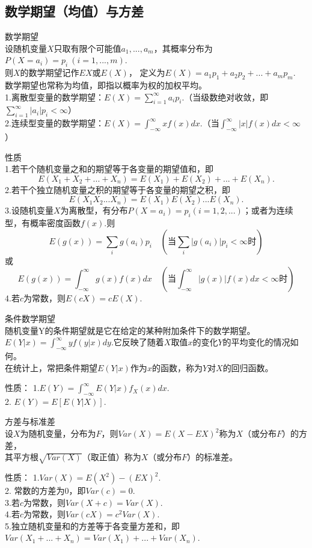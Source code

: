 \subsection{数学期望（均值）与方差}
\begin{definition}
  数学期望\\
  设随机变量$X$只取有限个可能值$a_1,...,a_m$，其概率分布为$P(X=a_i)=p_i\ (i=1,...,m)$.\\
  则$X$的数学期望记作$EX$或$E(X)$， 定义为$E(X)=a_1p_1+a_2p_2+...+a_mp_m$.\\
  数学期望也常称为均值，即指以概率为权的加权平均。\\
  1.离散型变量的数学期望：$E(X)=\sum^\infty_{i=1}a_ip_i.$（当级数绝对收敛，即$\sum_{i=1}^\infty|a_i|p_i<\infty$）\\
  2.连续型变量的数学期望：$E(X)=\int_{-\infty}^\infty xf(x)dx$.（当$\int_{-\infty}^\infty |x|f(x)dx<\infty$）
\end{definition}
性质\\
  1.若干个随机变量之和的期望等于各变量的期望值和，即
     $$
     E(X_1+X_2+...+X_n)=E(X_1)+E(X_2)+...+E(X_n).
     $$
  2.若干个独立随机变量之积的期望等于各变量的期望之积，即
     $$
     E(X_1X_2...X_n)=E(X_1)E(X_2)...E(X_n).
     $$
  3.设随机变量$X$为离散型，有分布$P(X=a_i)=p_i(i=1,2,...)$；或者为连续型，有概率密度函数$f(x)$.则
    $$
      E(g(x))=\sum_ig(a_i)p_i\quad (\text{当}\sum_i|g(a_i)|p_i<\infty \text{时})
    $$
      或
    $$
      E(g(x))=\int_{-\infty}^\infty g(x)f(x)dx \quad (\text{当}\int_{-\infty}^{\infty}|g(x)|f(x)dx<\infty\text{时})
   $$
  4.若$c$为常数，则$E(cX)=cE(X)$.\\
  \begin{definition}
    条件数学期望\\
    随机变量Y的条件期望就是它在给定的某种附加条件下的数学期望。\\
    $E(Y|x)=\int_{-\infty}^{\infty}yf(y|x)dy$.它反映了随着$X$取值$x$的变化$Y$的平均变化的情况如何。\\
    在统计上，常把条件期望$E(Y|x)$作为$x$的函数，称为$Y$对$X$的回归函数。
  \end{definition}
  性质：
    1.$E(Y)=\int_{-\infty}^{\infty}E(Y|x)f_X(x)dx$.\\
    2. $E(Y)=E[E(Y|X)]$.

\begin{definition}
  方差与标准差\\
  设$X$为随机变量，分布为$F$，则$Var(X)=E(X-EX)^2$称为$X$（或分布$F$）的方差，\\
  其平方根$\sqrt{Var(X)}$（取正值）称为$X$（或分布$F$）的标准差。
\end{definition}
性质：
  1.$Var(X)=E(X^2)-(EX)^2$.\\
  2. 常数的方差为0，即$Var(c)=0$.\\
  3.若$c$为常数，则$Var(X+c)=Var(X)$.\\
  4.若$c$为常数，则$Var(cX)=c^2Var(X)$.\\
  5.独立随机变量和的方差等于各变量方差和，即$Var(X_1+...+X_n)=Var(X_1)+...+Var(X_n)$.\\




